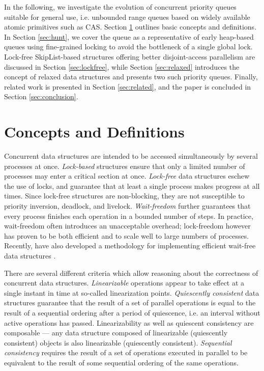 
In the following, we investigate the evolution of concurrent priority queues suitable for general use,
i.e. unbounded range queues based on widely available atomic primitives such as \ac{CAS}.
Section \ref{sec:concepts} outlines basic concepts and definitions. In Section \ref{sec:hunt},
we cover the \citeauthor{hunt1996efficient} queue as a representative of early heap-based queues using
fine-grained locking to avoid the bottleneck of a single global lock. Lock-free SkipList-based
structures offering better disjoint-access parallelism are discussed in Section \ref{sec:lockfree},
while Section \ref{sec:relaxed} introduces the concept of relaxed data structures and presents two
such priority queues. Finally, related work is presented in Section \ref{sec:related}, and the paper is
concluded in Section \ref{sec:conclusion}.

\section{Concepts and Definitions} \label{sec:concepts}


Concurrent data structures are intended to be accessed simultaneously by several processes
at once. \emph{Lock-based} structures ensure that only a limited number of processes may enter
a critical section at once. \emph{Lock-free} data structures eschew the use of locks, and guarantee
that at least a single process makes progress at all times. Since lock-free structures are
non-blocking, they are not susceptible to priority inversion, deadlock, and livelock.
\emph{Wait-freedom} further guarantees that every process finishes each operation in a bounded number of steps.
In practice, wait-freedom often introduces an unacceptable overhead; lock-freedom
however has proven to be both efficient and to scale well to large numbers of processes.
Recently, \citeauthor{kogan2012methodology} have also developed a methodology for implementing efficient
wait-free data structures \cite{kogan2012methodology}.


There are several different criteria which allow reasoning about the correctness of concurrent
data structures. \emph{Linearizable} \cite{herlihy1990linearizability} operations appear to take
effect at a single instant in time at so-called linearization points.
\emph{Quiescently consistent} \cite{shavit1996diffracting} data structures
guarantee that the result of a set of parallel operations is equal to the result of a sequential ordering
after a period of quiescence, i.e. an interval without active operations has passed.
Linearizability as well as quiescent consistency are composable ---
any data structure composed of linearizable (quiescently consistent) objects is also linearizable
(quiescently consistent).
\emph{Sequential consistency} \cite{lamport1979make} requires the result of a set of operations
executed in parallel to be equivalent to the result of some sequential ordering of the same
operations.

